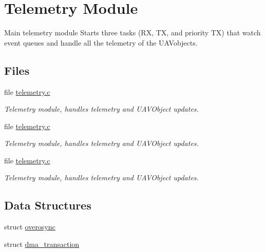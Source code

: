 \hypertarget{group___telemetry_module}{\section{Telemetry Module}
\label{group___telemetry_module}
}


Main telemetry module Starts three tasks (R\-X, T\-X, and priority T\-X) that watch event queues and handle all the telemetry of the U\-A\-Vobjects.  


\subsection*{Files}
\begin{DoxyCompactItemize}
\item 
file \hyperlink{telemetry_8c}{telemetry.\-c}
\begin{DoxyCompactList}\small\item\em Telemetry module, handles telemetry and U\-A\-V\-Object updates. \end{DoxyCompactList}\item 
file \hyperlink{telemetry_8c}{telemetry.\-c}
\begin{DoxyCompactList}\small\item\em Telemetry module, handles telemetry and U\-A\-V\-Object updates. \end{DoxyCompactList}\item 
file \hyperlink{telemetry_8c}{telemetry.\-c}
\begin{DoxyCompactList}\small\item\em Telemetry module, handles telemetry and U\-A\-V\-Object updates. \end{DoxyCompactList}\end{DoxyCompactItemize}
\subsection*{Data Structures}
\begin{DoxyCompactItemize}
\item 
struct \hyperlink{structoverosync}{overosync}
\item 
struct \hyperlink{structdma__transaction}{dma\-\_\-transaction}
\end{DoxyCompactItemize}
